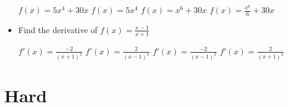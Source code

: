 \documentclass{exam}
\begin{document}
\begin{itemize}
    \begin{choices}
		\choice $f(x) = 5x^4 +30x$
		\choice $f(x) = 5x^4$
		\choice $f(x) = x^6 +30x$
		\CorrectChoice $f(x) = \frac{x^6}{6} +30x$
	\end{choices}
	\item Find the derivative of $f(x) = \frac{x-1}{x+1}$

	\begin{choices}
		\choice $f'(x) = \frac{-2}{(x+1)^2}$
		\choice $f'(x) = \frac{2}{(x-1)^2}$
		\choice $f'(x) = \frac{-2}{(x-1)^2}$
		\CorrectChoice $f'(x) = \frac{2}{(x+1)^2}$
	\end{choices}

\end{itemize}




\section{Hard}
\end{document}
